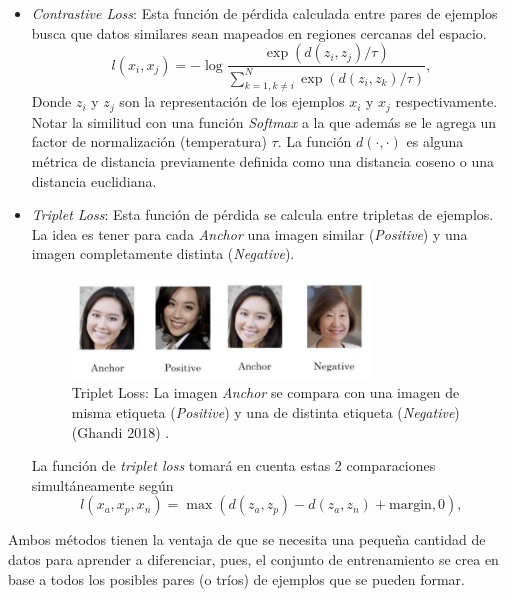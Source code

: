 \begin{itemize}
    \item \textit{Contrastive Loss}: Esta función de pérdida calculada entre pares de ejemplos busca que datos similares sean mapeados en regiones cercanas del espacio.
    \[
    l(x_i , x_j) = -\log\frac{\exp(d(z_i , z_j)/\tau)}{\sum_{k=1 , k \neq i}^N \exp(d(z_i , z_k)/\tau)} , 
    \]
    Donde $z_i$ y $z_j$ son la representación de los ejemplos $x_i$ y $x_j$ respectivamente. Notar la similitud con una función \textit{Softmax} a la que además se le agrega un factor de normalización (temperatura) $\tau$. La función $d(\cdot, \cdot)$ es alguna métrica de distancia previamente  definida como una distancia coseno o una distancia euclidiana. 
    
    \item \textit{Triplet Loss}: Esta función de pérdida se calcula entre tripletas de ejemplos. La idea es tener para cada \textit{Anchor} una imagen similar (\textit{Positive}) y una imagen completamente distinta (\textit{Negative}).
    
    \begin{figure}[h]
    \centering
    \includegraphics[width=8cm]{img/tesis/triplet_loss.jpeg}
    \caption{Triplet Loss: La imagen \textit{Anchor} se compara con una imagen de misma etiqueta (\textit{Positive}) y una de distinta etiqueta (\textit{Negative}) (Ghandi 2018) \cite{TripletLoss}.}
    \label{fig:triplet_loss}
    \end{figure}
    
    \noindent La función de \textit{triplet loss} tomará en cuenta estas 2 comparaciones simultáneamente según
    \[
    l(x_a , x_p, x_n) = \max(d(z_a, z_p) - d(z_a, z_n) + \text{margin} , 0) , 
    \]
    
    
\end{itemize}

Ambos métodos tienen la ventaja de que se necesita una pequeña cantidad de datos para aprender a diferenciar, pues, el conjunto de entrenamiento se crea en base a todos los posibles pares (o tríos) de ejemplos que se pueden formar.






